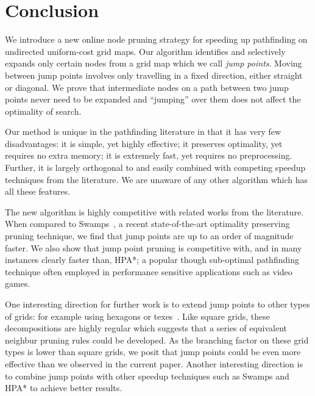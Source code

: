 \section{Conclusion}
We introduce a new online node pruning strategy for speeding
up pathfinding on undirected uniform-cost grid maps.  Our algorithm identifies
and selectively expands only certain nodes from a grid map which we call
\emph{jump points}.  Moving between jump points involves only travelling in a
fixed direction, either straight or diagonal.  We prove that intermediate nodes
on a path between two jump points never need to be expanded and ``jumping'' over
them does not affect the optimality of search.
\par
Our method is unique in the pathfinding literature in that it has very few
disadvantages: it is simple, yet highly effective; it preserves optimality, yet
requires no extra memory;  it is extremely fast, yet requires no preprocessing.
Further, it is largely orthogonal to and easily combined with 
competing speedup techniques from the literature.
We are unaware of any other algorithm which has all these features.
\par
The new algorithm is highly competitive with related works from the literature.
When compared to Swamps~\cite{pochter10}, 
a recent state-of-the-art optimality preserving pruning
technique, we find that jump points are up to an order of magnitude faster.
We also show that jump point pruning is competitive with, and in
many instances clearly faster than, HPA*; a popular though sub-optimal pathfinding
technique often employed in performance sensitive applications such as
video games.
\par
One interesting direction for further work is to extend jump points to other
types of grids: for example using hexagons or texes~\cite{yap02}.
Like square grids, these decompositions are highly regular which suggests that
a series of equivalent neighbur pruning rules could be developed.
As the branching factor on these grid types is lower than square grids, we posit
that jump points could be even more effective than we observed in the current paper.
Another interesting direction is to combine jump points with other
speedup techniques such as Swamps and HPA* to achieve better results.
